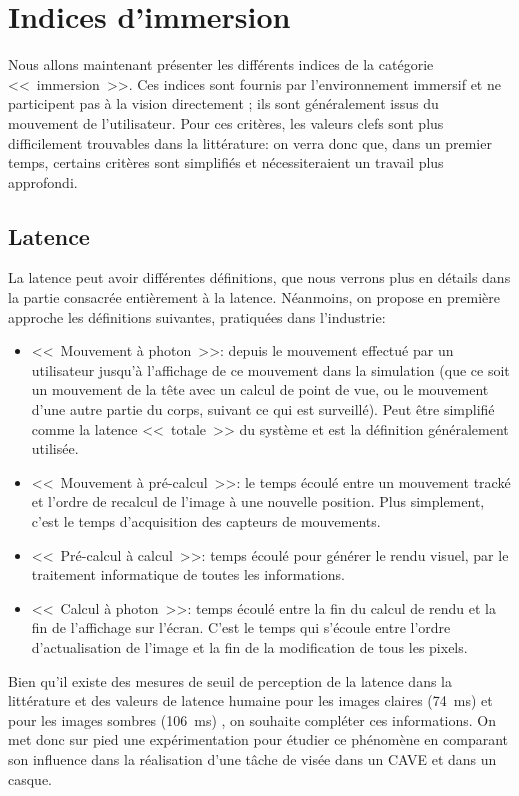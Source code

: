 \chapter{Indices d'immersion}
\par Nous allons maintenant présenter les différents indices de la catégorie <<~immersion~>>. Ces indices sont fournis par l'environnement immersif et ne participent pas à la vision directement ; ils sont généralement issus du mouvement de l'utilisateur. Pour ces critères, les valeurs clefs sont plus difficilement trouvables dans la littérature: on verra donc que, dans un premier temps, certains critères sont simplifiés et nécessiteraient un travail plus approfondi.
	
	\section{Latence}
	\par La latence peut avoir différentes définitions, que nous verrons plus en détails dans la partie consacrée entièrement à la latence. Néanmoins, on propose en première approche les définitions suivantes, pratiquées dans l'industrie:
	\begin{itemize}
		\item <<~Mouvement à photon~>>: depuis le mouvement effectué par un utilisateur jusqu'à l'affichage de ce mouvement dans la simulation (que ce soit un mouvement de la tête avec un calcul de point de vue, ou le mouvement d'une autre partie du corps, suivant ce qui est surveillé). Peut être simplifié comme la latence <<~totale~>> du système et est la définition généralement utilisée.
		\item <<~Mouvement à pré-calcul~>>: le temps écoulé entre un mouvement tracké et l'ordre de recalcul de l'image à une nouvelle position. Plus simplement, c'est le temps d'acquisition des capteurs de mouvements.
		\item <<~Pré-calcul à calcul~>>: temps écoulé pour générer le rendu visuel, par le traitement informatique de toutes les informations.
		\item <<~Calcul à photon~>>: temps écoulé entre la fin du calcul de rendu et la fin de l'affichage sur l'écran. C'est le temps qui s'écoule entre l'ordre d'actualisation de l'image et la fin de la modification de tous les pixels.
	\end{itemize}
	
	\par Bien qu'il existe des mesures de seuil de perception de la latence dans la littérature \citep{brooks_whats_1999,kemeny_driving_2014} et des valeurs de latence humaine pour les images claires (74~ms) et pour les images sombres (106~ms) \citep{feng_han_investigation_2010}, on souhaite compléter ces informations. On met donc sur pied une expérimentation pour étudier ce phénomène en comparant son influence dans la réalisation d'une tâche de visée dans un CAVE et dans un casque.
	
